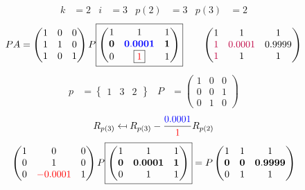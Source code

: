 \documentclass[pdf]{beamer}
\begin{document}
\begin{frame}{}\begin{align*} k &= 2 & i &= 3 & p(2) &= 3 & p(3) &= 2\end{align*} $$PA=\begin{pmatrix}1&0&0\\1&1&0\\1&0&1\end{pmatrix} P \boxed{\begin{pmatrix}1&1&1\\\mathbf{0}&\mathbf{{\color{blue}0.0001}}&\mathbf{1}\\0&\boxed{{\color{red}1}}&1\end{pmatrix}} \quad\quad \begin{pmatrix}1&1&1\\{\color{purple}1}&{\color{purple}0.0001}&0.9999\\{\color{purple}1}&1&1\end{pmatrix}$$ \begin{align*} p&= \begin{Bmatrix}1&3&2\end{Bmatrix} & P&= \begin{pmatrix}1&0&0\\0&0&1\\0&1&0\end{pmatrix} \end{align*} $$R_{p(3)} \mapsfrom R_{p(3)} - \frac{{\color{blue}0.0001}}{{\color{red}1}} R_{p(2)}$$ $$ \begin{pmatrix}1&0&0\\0&1&0\\0&{\color{red}-0.0001}&1\end{pmatrix} P \boxed{\begin{pmatrix}1&1&1\\\mathbf{0}&\mathbf{0.0001}&\mathbf{1}\\0&1&1\end{pmatrix}} = P \begin{pmatrix}1&1&1\\\mathbf{0}&\mathbf{0}&\mathbf{0.9999}\\0&1&1\end{pmatrix} $$\end{frame}
\end{document}
